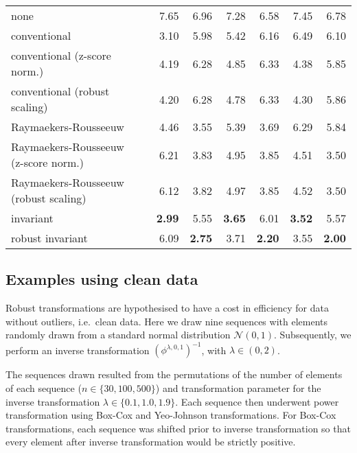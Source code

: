 \documentclass[
  a4paper,
]{article}
\begin{document}
\begin{table}
\begin{center}
\begin{tabular}{l | l r r r r r r}
none                                  & &         7.65  &         6.96  &         7.28  &         6.58  &         7.45  &         6.78 \\
conventional                          & &         3.10  &         5.98  &         5.42  &         6.16  &         6.49  &         6.10 \\
conventional (z-score norm.)          & &         4.19  &         6.28  &         4.85  &         6.33  &         4.38  &         5.85 \\
conventional (robust scaling)         & &         4.20  &         6.28  &         4.78  &         6.33  &         4.30  &         5.86 \\
Raymaekers-Rousseeuw                  & &         4.46  &         3.55  &         5.39  &         3.69  &         6.29  &         5.84 \\ 
Raymaekers-Rousseeuw (z-score norm.)  & &         6.21  &         3.83  &         4.95  &         3.85  &         4.51  &         3.50 \\ 
Raymaekers-Rousseeuw (robust scaling) & &         6.12  &         3.82  &         4.97  &         3.85  &         4.52  &         3.50 \\
invariant                             & & \textbf{2.99} &         5.55  & \textbf{3.65} &         6.01  & \textbf{3.52} &         5.57 \\
robust invariant                      & &         6.09  & \textbf{2.75} &         3.71  & \textbf{2.20} &         3.55  & \textbf{2.00} \\

\bottomrule
\end{tabular}
\end{center}
\end{table}

\subsection{Examples using clean data}\label{examples-using-clean-data}

Robust transformations are hypothesised to have a cost in efficiency for
data without outliers, i.e.~clean data. Here we draw nine sequences with
elements randomly drawn from a standard normal distribution
\(\mathcal{N}(0,1)\). Subsequently, we perform an inverse transformation
\(\left(\phi^{\lambda, 0, 1}\right)^{-1}\), with
\(\lambda \in \left(0, 2\right)\).

The sequences drawn resulted from the permutations of the number of
elements of each sequence (\(n \in \{30, 100, 500\}\)) and
transformation parameter for the inverse transformation
\(\lambda \in \{0.1, 1.0, 1.9\}\). Each sequence then underwent power
transformation using Box-Cox and Yeo-Johnson transformations. For
Box-Cox transformations, each sequence was shifted prior to inverse
transformation so that every element after inverse transformation would
be strictly positive.
\end{document}
